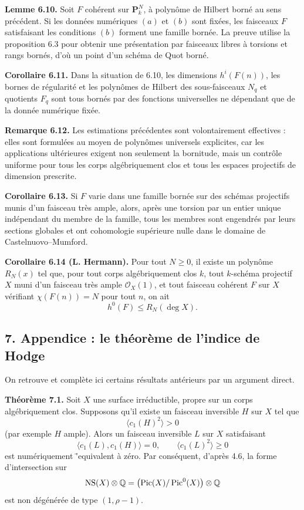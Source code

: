 \documentclass[11pt]{article}
\providecommand{\Pic}{\operatorname{Pic}}
\providecommand{\Q}{\mathbb Q}
\begin{document}
\textbf{Lemme 6.10.} Soit $F$ coh\'erent sur $\mathbf P^N_k$, \`a polyn\^ome de Hilbert born\'e au sens pr\'ec\'edent. Si les donn\'ees num\'eriques $(a)$ et $(b)$ sont fix\'ees, les faisceaux $F$ satisfaisant les conditions $(b)$ forment une famille born\'ee. La preuve utilise la proposition 6.3 pour obtenir une pr\'esentation par faisceaux libres \`a torsions et rangs born\'es, d'o\`u un point d'un sch\'ema de Quot born\'e.

\textbf{Corollaire 6.11.} Dans la situation de 6.10, les dimensions $h^i(F(n))$, les bornes de r\'egularit\'e et les polyn\^omes de Hilbert des sous-faisceaux $N_q$ et quotients $F_q$ sont tous born\'es par des fonctions universelles ne d\'ependant que de la donn\'ee num\'erique fix\'ee.

\textbf{Remarque 6.12.} Les estimations pr\'ec\'edentes sont volontairement effectives : elles sont formul\'ees au moyen de polyn\^omes universels explicites, car les applications ult\'erieures exigent non seulement la bornitude, mais un contr\^ole uniforme pour tous les corps alg\'ebriquement clos et tous les espaces projectifs de dimension prescrite.

\textbf{Corollaire 6.13.} Si $F$ varie dans une famille born\'ee sur des sch\'emas projectifs munis d'un faisceau tr\`es ample, alors, apr\`es une torsion par un entier unique ind\'ependant du membre de la famille, tous les membres sont engendr\'es par leurs sections globales et ont cohomologie sup\'erieure nulle dans le domaine de Castelnuovo--Mumford.

\textbf{Corollaire 6.14 (L. Hermann).} Pour tout $N\ge0$, il existe un polyn\^ome $R_N(x)$ tel que, pour tout corps alg\'ebriquement clos $k$, tout $k$-sch\'ema projectif $X$ muni d'un faisceau tr\`es ample $\mathcal O_X(1)$, et tout faisceau coh\'erent $F$ sur $X$ v\'erifiant $\chi(F(n))=N$ pour tout $n$, on ait
\[
   h^0(F)\le R_N(\deg X).
\]

\subsection*{7. Appendice : le th\'eor\`eme de l'indice de Hodge}

On retrouve et compl\`ete ici certains r\'esultats ant\'erieurs par un argument direct.

\textbf{Th\'eor\`eme 7.1.} Soit $X$ une surface irr\'eductible, propre sur un corps alg\'ebriquement clos. Supposons qu'il existe un faisceau inversible $H$ sur $X$ tel que
\[
   \langle c_1(H)^2\rangle>0
\]
(par exemple $H$ ample). Alors un faisceau inversible $L$ sur $X$ satisfaisant
\[
   \langle c_1(L),c_1(H)\rangle=0,
   \qquad
   \langle c_1(L)^2\rangle\ge0
\]
est num\'eriquement \='equivalent \`a z\'ero. Par cons\'equent, d'apr\`es 4.6, la forme d'intersection sur
\[
   \NS(X)\otimes\Q=\bigl(\Pic(X)/\Pic^0(X)\bigr)\otimes\Q
\]
est non d\'eg\'en\'er\'ee de type $(1,\rho-1)$.
\end{document}
